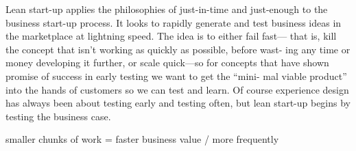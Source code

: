 Lean start-up applies the philosophies of just-in-time and just-enough to the business start-up process. It looks to rapidly generate and test business ideas in the marketplace at lightning speed. The idea is to either fail fast— that is, kill the concept that isn’t working as quickly as possible, before wast- ing any time or money developing it further, or scale quick—so for concepts that have shown promise of success in early testing we want to get the “mini- mal viable product” into the hands of customers so we can test and learn.
Of course experience design has always been about testing early and testing often, but lean start-up begins by testing the business case.

smaller chunks of work = faster business value / more frequently